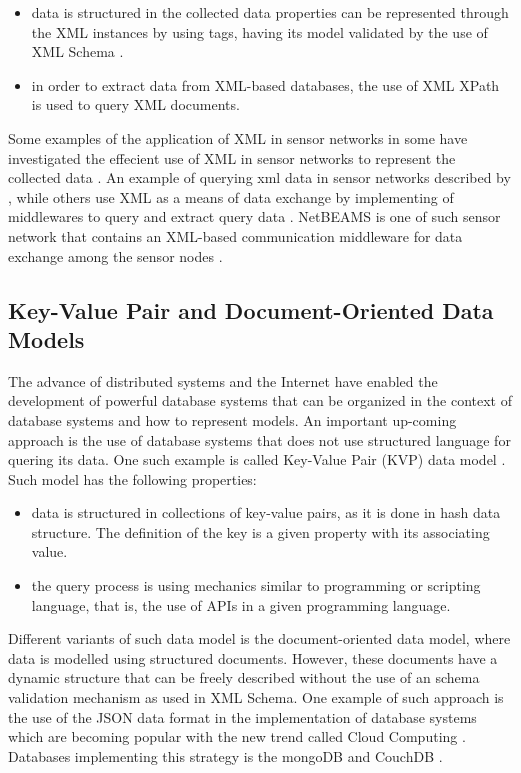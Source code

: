 \begin{itemize}
  \item data is structured in the collected data properties can be represented through the
XML \cite{xml} instances by using tags, having its model validated by the use
of XML Schema \cite{xml-schema}.
  \item in order to extract data from XML-based databases, the use of XML XPath
  is used to query XML documents.
\end{itemize}

Some examples of the application of XML in sensor networks in 
\cite{sn-xml-usage02} some have investigated the effecient use of XML in
sensor networks to represent the collected data \cite{sn-xml-usage01}. An
example of querying xml data in sensor networks described by
\cite{sn-xml-query-engines}, while others use XML as a means of data exchange
by implementing of middlewares to query and extract query data
\cite{sn-xml-middleware}. NetBEAMS is one of such sensor network that contains
an XML-based communication middleware for data exchange among the sensor nodes
\cite{netbeams2009}.

\subsection{Key-Value Pair and Document-Oriented Data Models}

The advance of distributed systems and the Internet have enabled the
development of powerful database systems that can be organized in the context
of database systems and how to represent models. An important up-coming
approach is the use of database systems that does not use structured language
for quering its data. One such example is called Key-Value Pair (KVP) data model
\cite{db-kvp}. Such model has the following properties:

\begin{itemize}
  \item data is structured in collections of key-value pairs, as it is done in
  hash data structure. The definition of the key is a given property with its
  associating value.
  \item the query process is using mechanics similar to programming or
  scripting language, that is, the use of APIs in a given programming language.
\end{itemize}

Different variants of such data model is the document-oriented data model,
where data is modelled using structured documents. However, these documents
have a dynamic structure that can be freely described without the use of an
schema validation mechanism as used in XML Schema. One example of such
approach is the use of the JSON data format \cite{json} in the implementation
of database systems which are becoming popular with the new trend called Cloud
Computing \cite{cloud-comp-architectures}. Databases implementing this strategy
is the mongoDB \cite{mongodb} and CouchDB \cite{mongodb}.

